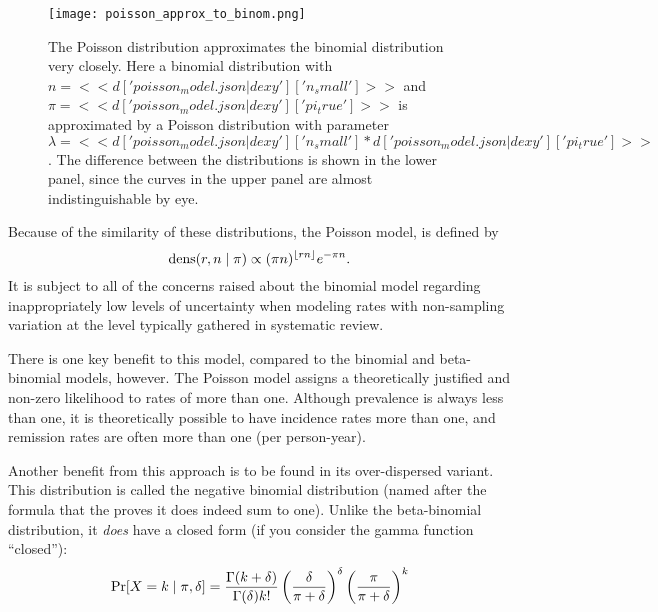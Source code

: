 \begin{figure}
\begin{center}
\texttt{[image: poisson\_approx\_to\_binom.png]}
\end{center}
\caption{The Poisson distribution approximates the binomial
  distribution very closely. Here a binomial distribution with
  $n=<<d['poisson_model.json|dexy']['n_small']>>$ and
  $\pi=<<d['poisson_model.json|dexy']['pi_true']>>$ is approximated by
  a Poisson distribution with parameter
  $\lambda=<<d['poisson_model.json|dexy']['n_small'] *
  d['poisson_model.json|dexy']['pi_true']>>$.  The difference between
  the distributions is shown in the lower panel, since the curves in
  the upper panel are almost indistinguishable by eye.}
\label{fig:theory-rate_model-poisson_approx_to_binom}
\end{figure}

Because of the similarity of these distributions, the Poisson model,
is defined by
\[
\operatorname{dens}(r,n\;|\; \pi) \propto (\pi n)^{\lfloor rn\rfloor} e^{-\pi n}.
\]
It is subject to all of the concerns raised about the
binomial model regarding inappropriately low levels of uncertainty
when modeling rates with non-sampling variation at the level typically
gathered in systematic review.

There is one key benefit to this model, compared to the binomial and
beta-binomial models, however.  The Poisson model assigns a
theoretically justified and non-zero likelihood to rates of more than
one.  Although prevalence is always less than one, it is theoretically
possible to have incidence rates more than one, and remission rates
are often more than one (per person-year).

Another benefit from this approach is to be found in its
over-dispersed variant.  This distribution
is called the negative binomial distribution (named after the formula
that the proves it does indeed sum to one).  Unlike the beta-binomial
distribution, it \emph{does} have a closed form (if you consider the gamma function ``closed''):
\[
\operatorname{Pr}[X = k\;|\; \pi, \delta] = \frac{\Gamma(k+\delta)}{\Gamma(\delta)k!}
\left(\frac{\delta}{\pi+\delta}\right)^\delta \left(\frac{\pi}{\pi+\delta}\right)^k
\]

